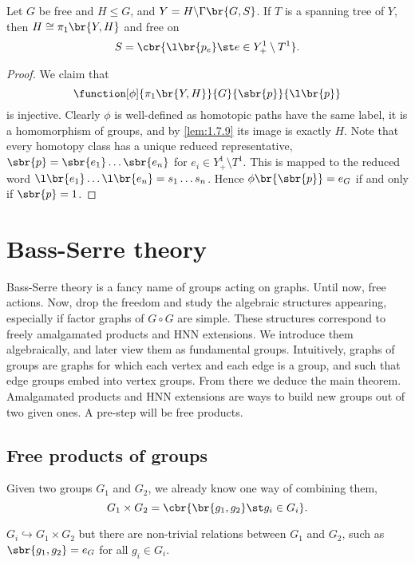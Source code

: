 \begin{theorem}
Let $ G $ be free and $ H \le G $, and $ Y = H \backslash \Gamma\br{G, S} $. If $ T $ is a spanning tree of $ Y $, then $ H \cong \pi_1\br{Y, H} $ and free on
$$ S = \cbr{\l\br{p_e} \st e \in Y_+^1 \setminus T^1}. $$
\end{theorem}

\begin{proof}
We claim that
$$ \function[\phi]{\pi_1\br{Y, H}}{G}{\sbr{p}}{\l\br{p}} $$
is injective. Clearly $ \phi $ is well-defined as homotopic paths have the same label, it is a homomorphism of groups, and by \ref{lem:1.7.9} its image is exactly $ H $. Note that every homotopy class has a unique reduced representative, $ \sbr{p} = \sbr{e_1} \dots \sbr{e_n} $ for $ e_i \in Y_+^1 \setminus T^1 $. This is mapped to the reduced word $ \l\br{e_1} \dots \l\br{e_n} = s_1 \dots s_n $. Hence $ \phi\br{\sbr{p}} = e_G $ if and only if $ \sbr{p} = 1 $.
\end{proof}

\pagebreak

\section{Bass-Serre theory}


Bass-Serre theory is a fancy name of groups acting on graphs. Until now, free actions. Now, drop the freedom and study the algebraic structures appearing, especially if factor graphs of $ G \circ G $ are simple. These structures correspond to freely amalgamated products and HNN extensions. We introduce them algebraically, and later view them as fundamental groups. Intuitively, graphs of groups are graphs for which each vertex and each edge is a group, and such that edge groups embed into vertex groups. From there we deduce the main theorem. Amalgamated products and HNN extensions are ways to build new groups out of two given ones. A pre-step will be free products.

\subsection{Free products of groups}

Given two groups $ G_1 $ and $ G_2 $, we already know one way of combining them,
$$ G_1 \times G_2 = \cbr{\br{g_1, g_2} \st g_i \in G_i}. $$

\begin{note*}
$ G_i \hookrightarrow G_1 \times G_2 $ but there are non-trivial relations between $ G_1 $ and $ G_2 $, such as $ \sbr{g_1, g_2} = e_G $ for all $ g_i \in G_i $.
\end{note*}

